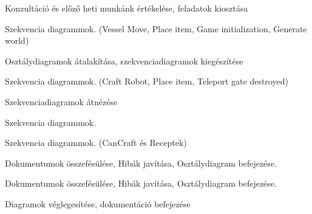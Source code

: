 \documentclass[../../projlab]{subfiles}
\begin{document}
\begin{naplo}

	{ 
		Konzultáció és előző heti munkánk értékelése, feladatok kiosztása   
	}

	{ 
		Szekvencia diagrammok. (Vessel Move, Place item, Game initialization, Generate world)
	}

	{ 
		Osztálydiagramok átalakítása, szekvenciadiagramok kiegészítése
	}
	
	{ 
		Szekvencia diagrammok. (Craft Robot, Place item, Teleport gate destroyed)
	}

	{ 
		Szekvenciadiagramok átnézése   
	}

	{ 
		Szekvencia diagrammok.   
	}

	{ 
		Szekvencia diagrammok. (CanCraft és Receptek)
	}

	{ 
		Dokumentumok összefésülése, Hibák javítása, Osztálydiagram befejezése.   
	}

	{ 
		Dokumentumok összefésülése, Hibák javítása, Osztálydiagram befejezése.   
	}

	{ 
		Diagramok véglegesítése, dokumentáció befejezése   
	}

\end{naplo}

\begin{toappendix}



	
\end{toappendix}
\end{document}
